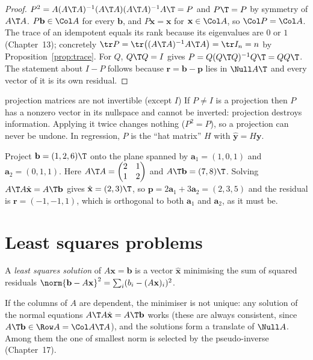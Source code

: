 \begin{proof}
$P^2=A(A\T A)^{-1}(A\T A)(A\T A)^{-1}A\T=P$ and $P\T=P$ by symmetry of $A\T A$. $P\mathbf{b}\in\Col A$ for every $\mathbf{b}$, and $P\mathbf{x}=\mathbf{x}$ for $\mathbf{x}\in\Col A$, so $\Col P=\Col A$. The trace of an idempotent equals its rank because its eigenvalues are $0$ or $1$ (Chapter~13); concretely $\tr P=\tr\big((A\T A)^{-1}A\T A\big)=\tr I_n=n$ by Proposition~\ref{prop:trace}. For $Q$, $Q\T Q=I$ gives $P=Q(Q\T Q)^{-1}Q\T=QQ\T$. The statement about $I-P$ follows because $\mathbf{r}=\mathbf{b}-\mathbf{p}$ lies in $\Null A\T$ and every vector of it is its own residual.
\end{proof}

\begin{pitfall}{projection matrices are not invertible (except $I$)}
If $P\ne I$ is a projection then $P$ has a nonzero vector in its nullspace and cannot be inverted: projection destroys information. Applying it twice changes nothing ($P^2=P$), so a projection can never be undone. In regression, $P$ is the ``hat matrix'' $H$ with $\hat{\mathbf{y}}=H\mathbf{y}$.
\end{pitfall}

\begin{example}
Project $\mathbf{b}=(1,2,6)\T$ onto the plane spanned by $\mathbf{a}_1=(1,0,1)$ and $\mathbf{a}_2=(0,1,1)$. Here $A\T A=\begin{pmatrix}2&1\\1&2\end{pmatrix}$ and $A\T\mathbf{b}=(7,8)\T$. Solving $A\T A\hat{\mathbf{x}}=A\T\mathbf{b}$ gives $\hat{\mathbf{x}}=(2,3)\T$, so $\mathbf{p}=2\mathbf{a}_1+3\mathbf{a}_2=(2,3,5)$ and the residual is $\mathbf{r}=(-1,-1,1)$, which is orthogonal to both $\mathbf{a}_1$ and $\mathbf{a}_2$, as it must be.
\end{example}

\section{Least squares problems}

\begin{definition}
A \emph{least squares solution} of $A\mathbf{x}=\mathbf{b}$ is a vector $\hat{\mathbf{x}}$ minimising the sum of squared residuals $\norm{\mathbf{b}-A\mathbf{x}}^2=\sum_i(b_i-(A\mathbf{x})_i)^2$.
\end{definition}

If the columns of $A$ are dependent, the minimiser is not unique: any solution of the normal equations $A\T A\hat{\mathbf{x}}=A\T\mathbf{b}$ works (these are always consistent, since $A\T\mathbf{b}\in\Row A=\Col A\T A$), and the solutions form a translate of $\Null A$. Among them the one of smallest norm is selected by the pseudo-inverse (Chapter~17).

